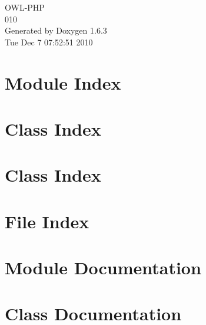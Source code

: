 \documentclass[a4paper]{book}
\begin{document}
\begin{titlepage}
\vspace*{7cm}
\begin{center}
{\Large OWL-\/PHP \\[1ex]\large 010 }\\
\vspace*{1cm}
{\large Generated by Doxygen 1.6.3}\\
\vspace*{0.5cm}
{\small Tue Dec 7 07:52:51 2010}\\
\end{center}
\end{titlepage}
\clearemptydoublepage
{}
\tableofcontents
\clearemptydoublepage
{}
\chapter{Module Index}

\chapter{Class Index}

\chapter{Class Index}

\chapter{File Index}

\chapter{Module Documentation}




\chapter{Class Documentation}































\end{document}
